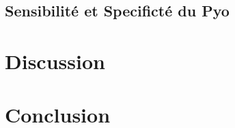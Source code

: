 \documentclass[12pt,a4paper]{article}
\begin{document}
\subsection{Sensibilité et Specificté du Pyo}

\section{Discussion}


\section{Conclusion}





\newpage

\appendix

\newpage




\end{document}
